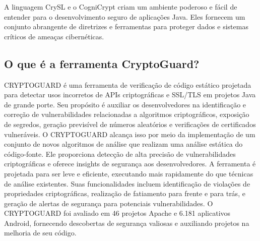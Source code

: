 A linguagem CrySL e o CogniCrypt criam um ambiente poderoso e fácil de entender para o desenvolvimento seguro de aplicações Java. Eles fornecem um conjunto abrangente de diretrizes e ferramentas para proteger dados e sistemas críticos de ameaças cibernéticas. \cite{CogniCrypt}



\subsection{O que é a ferramenta CryptoGuard?}

CRYPTOGUARD é uma ferramenta de verificação de código estático projetada para detectar usos incorretos de APIs criptográficas e SSL/TLS em projetos Java de grande porte. \cite{CryptoGuard} Seu propósito é auxiliar os desenvolvedores na identificação e correção de vulnerabilidades relacionadas a algoritmos criptográficos, exposição de segredos, geração previsível de números aleatórios e verificações de certificados vulneráveis. \cite{CryptoGuard} O CRYPTOGUARD alcança isso por meio da implementação de um conjunto de novos algoritmos de análise que realizam uma análise estática do código-fonte. \cite{CryptoGuard} Ele proporciona detecção de alta precisão de vulnerabilidades criptográficas e oferece insights de segurança aos desenvolvedores. \cite{CryptoGuard} A ferramenta é projetada para ser leve e eficiente, executando mais rapidamente do que técnicas de análise existentes. \cite{CryptoGuard} Suas funcionalidades incluem identificação de violações de propriedades criptográficas, realização de fatiamento para frente e para trás, e geração de alertas de segurança para potenciais vulnerabilidades. \cite{CryptoGuard} O CRYPTOGUARD foi avaliado em 46 projetos Apache e 6.181 aplicativos Android, fornecendo descobertas de segurança valiosas e auxiliando projetos na melhoria de seu código.  \cite{CryptoGuard}



